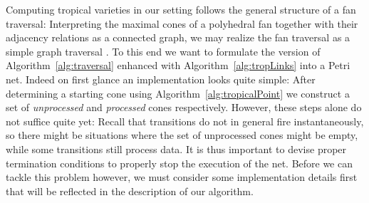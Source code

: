 \documentclass[
  paper=a4,
  titlepage,
  bibliography=totoc,
  listof=totoc,
  pagesize=pdftex
]{scrartcl}
\numberwithin{figure}{section}
\numberwithin{equation}{section}
\numberwithin{table}{section}
\theoremstyle{definition}
\numberwithin{definition}{section}
\begin{document}
Computing tropical varieties in our setting follows the general structure of a fan
traversal: Interpreting the maximal cones of a polyhedral fan together with their
adjacency relations as a connected graph, we may realize the fan traversal as a simple
graph traversal \cite{JenTravSym}. To this end we want to formulate the version of
Algorithm~\ref{alg:traversal} enhanced with Algorithm~\ref{alg:tropLinks} into a Petri
net. Indeed on first glance an implementation looks quite simple: After determining a
starting cone using Algorithm~\ref{alg:tropicalPoint} we construct a set of
\emph{unprocessed} and \emph{processed} cones respectively. However, these steps alone do
not suffice quite yet: Recall that transitions do not in general fire instantaneously, so
there might be situations where the set of unprocessed cones might be empty, while some
transitions still process data. It is thus important to devise proper termination
conditions to properly stop the execution of the net. Before we can tackle this problem
however, we must consider some implementation details first that will be reflected in the
description of our algorithm.
\end{document}
